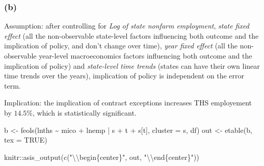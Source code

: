 \documentclass[
]{article}
\newenvironment{Shaded}{\begin{snugshade}}{\end{snugshade}}
\newcommand{\AttributeTok}[1]{\textcolor[rgb]{0.77,0.63,0.00}{#1}}
\newcommand{\ConstantTok}[1]{\textcolor[rgb]{0.00,0.00,0.00}{#1}}
\newcommand{\FunctionTok}[1]{\textcolor[rgb]{0.00,0.00,0.00}{#1}}
\newcommand{\NormalTok}[1]{#1}
\newcommand{\OtherTok}[1]{\textcolor[rgb]{0.56,0.35,0.01}{#1}}
\newcommand{\SpecialCharTok}[1]{\textcolor[rgb]{0.00,0.00,0.00}{#1}}
\newcommand{\StringTok}[1]{\textcolor[rgb]{0.31,0.60,0.02}{#1}}
\begin{document}
\hypertarget{b-1}{%
\subsubsection{(b)}\label{b-1}}

Assumption: after controlling for \emph{Log of state nonfarm
employment}, \emph{state fixed effect} (all the non-observable
state-level factors influencing both outcome and the implication of
policy, and don't change over time), \emph{year fixed effect} (all the
non-observable year-level macroeconomics factors influencing both
outcome and the implication of policy) and \emph{state-level time
trends} (states can have their own linear time trends over the years),
implication of policy is independent on the error term.

Implication: the implication of contract exceptions increases THS
employement by \(14.5\%\), which is statistically significant.

\begin{Shaded}
\begin{Highlighting}[]
\NormalTok{b }\OtherTok{\textless{}{-}} \FunctionTok{feols}\NormalTok{(lnths }\SpecialCharTok{\textasciitilde{}}\NormalTok{ mico }\SpecialCharTok{+}\NormalTok{ lnemp }\SpecialCharTok{|}\NormalTok{ s }\SpecialCharTok{+}\NormalTok{ t }\SpecialCharTok{+}\NormalTok{ s[t], }\AttributeTok{cluster =} \StringTok{\textquotesingle{}s\textquotesingle{}}\NormalTok{, df)}
\NormalTok{out }\OtherTok{\textless{}{-}} \FunctionTok{etable}\NormalTok{(b, }\AttributeTok{tex =} \ConstantTok{TRUE}\NormalTok{) }
\end{Highlighting}
\end{Shaded}

\begin{Shaded}
\begin{Highlighting}[]
\NormalTok{knitr}\SpecialCharTok{::}\FunctionTok{asis\_output}\NormalTok{(}\FunctionTok{c}\NormalTok{(}\StringTok{"}\SpecialCharTok{\textbackslash{}\textbackslash{}}\StringTok{begin\{center\}"}\NormalTok{, out, }\StringTok{"}\SpecialCharTok{\textbackslash{}\textbackslash{}}\StringTok{end\{center\}"}\NormalTok{)) }
\end{Highlighting}
\end{Shaded}
\end{document}
